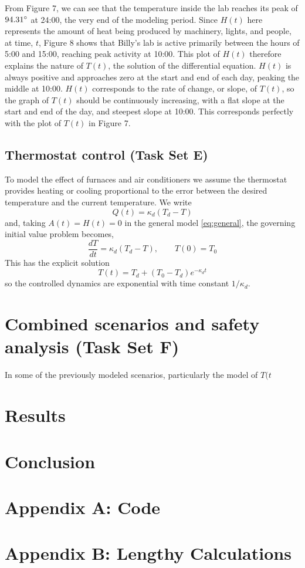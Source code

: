 \documentclass[12pt]{article}
\begin{document}
From Figure 7, we can see that the temperature inside the lab reaches its peak of $94.31\degree$ at 24:00, the very end of the modeling period. Since $H(t)$ here represents the amount of heat being produced by machinery, lights, and people, at time, $t$, Figure 8 shows that Billy's lab is active primarily between the hours of 5:00 and 15:00, reaching peak activity at 10:00. This plot of $H(t)$ therefore explains the nature of $T(t)$, the solution of the differential equation. $H(t)$ is always positive and approaches zero at the start and end of each day, peaking the middle at 10:00. $H(t)$ corresponds to the rate of change, or slope, of $T(t)$, so the graph of $T(t)$ should be continuously increasing, with a flat slope at the start and end of the day, and steepest slope at 10:00. This corresponds perfectly with the plot of $T(t)$ in Figure 7.

\subsection{Thermostat control (Task Set E)}
To model the effect of furnaces and air conditioners we assume the thermostat provides heating or cooling proportional to the error between the desired temperature and the current temperature. We write
\begin{equation}
Q(t)=\kappa_d(T_d-T)
\label{Qthermostat}
\end{equation}
and, taking $A(t)=H(t)=0$ in the general model \eqref{eq:general}, the governing initial value problem becomes,
\begin{equation}
\frac{dT}{dt} = \kappa_d(T_d - T), \qquad T(0)=T_0
\label{eq:thermostat_ode}
\end{equation}
This has the explicit solution
\begin{equation}
T(t)=T_d+(T_0-T_d)e^{-\kappa_dt}
\label{eq:thermostat_solution}
\end{equation}
so the controlled dynamics are exponential with time constant $1/\kappa_d$.

\section{Combined scenarios and safety analysis (Task Set F)}
In some of the previously modeled scenarios, particularly the model of $T(t$
\clearpage
\section{Results}

\section{Conclusion}

\clearpage
\appendix
\section{Appendix A: Code}



\section{Appendix B: Lengthy Calculations}
\end{document}
